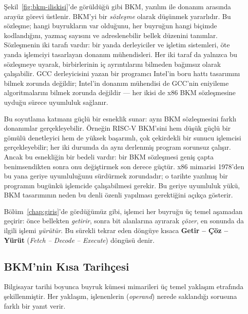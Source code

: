 Şekil~\ref{fig:bkm-iliskisi}'de görüldüğü gibi BKM, yazılım ile donanım arasında arayüz görevi üstlenir. BKM'yi bir \emph{sözleşme} olarak düşünmek yararlıdır. Bu sözleşme; hangi buyrukların var olduğunu, her buyruğun hangi biçimde kodlandığını, yazmaç sayısını ve adreslenebilir bellek düzenini tanımlar. Sözleşmenin iki tarafı vardır: bir yanda derleyiciler ve işletim sistemleri, öte yanda işlemciyi tasarlayan donanım mühendisleri. Her iki taraf da yalnızca bu sözleşmeye uyarak, birbirlerinin iç ayrıntılarını bilmeden bağımsız olarak çalışabilir. GCC derleyicisini yazan bir programcı Intel'in boru hattı tasarımını bilmek zorunda değildir; Intel'in donanım mühendisi de GCC'nin eniyileme algoritmalarını bilmek zorunda değildir --- her ikisi de x86 BKM sözleşmesine uyduğu sürece uyumluluk sağlanır.

Bu soyutlama katmanı güçlü bir esneklik sunar: aynı BKM sözleşmesini farklı donanımlar gerçekleyebilir. Örneğin RISC-V BKM'sini hem düşük güçlü bir gömülü denetleyici hem de yüksek başarımlı, çok çekirdekli bir sunucu işlemcisi gerçekleyebilir; her iki durumda da aynı derlenmiş program sorunsuz çalışır. Ancak bu esnekliğin bir bedeli vardır: bir BKM sözleşmesi geniş çapta benimsendikten sonra onu değiştirmek son derece güçtür. x86 mimarisi 1978'den bu yana geriye uyumluluğunu sürdürmek zorundadır; o tarihte yazılmış bir programın bugünkü işlemcide çalışabilmesi gerekir. Bu geriye uyumluluk yükü, BKM tasarımının neden bu denli özenli yapılması gerektiğini açıkça gösterir.

Bölüm~\ref{chap:giris}'de gördüğümüz gibi, işlemci her buyruğu üç temel aşamadan geçirir: önce bellekten \emph{getirir}, sonra bit alanlarına ayırarak \emph{çözer}, en sonunda da ilgili işlemi \emph{yürütür}. Bu sürekli tekrar eden döngüye kısaca \textbf{Getir -- Çöz -- Yürüt} (\emph{Fetch -- Decode -- Execute}) döngüsü denir.


\subsection{BKM'nin Kısa Tarihçesi}
\label{subsec:bkm-tarihce}

Bilgisayar tarihi boyunca buyruk kümesi mimarileri üç temel yaklaşım etrafında şekillenmiştir. Her yaklaşım, işlenenlerin (\emph{operand}) nerede saklandığı sorusuna farklı bir yanıt verir.

